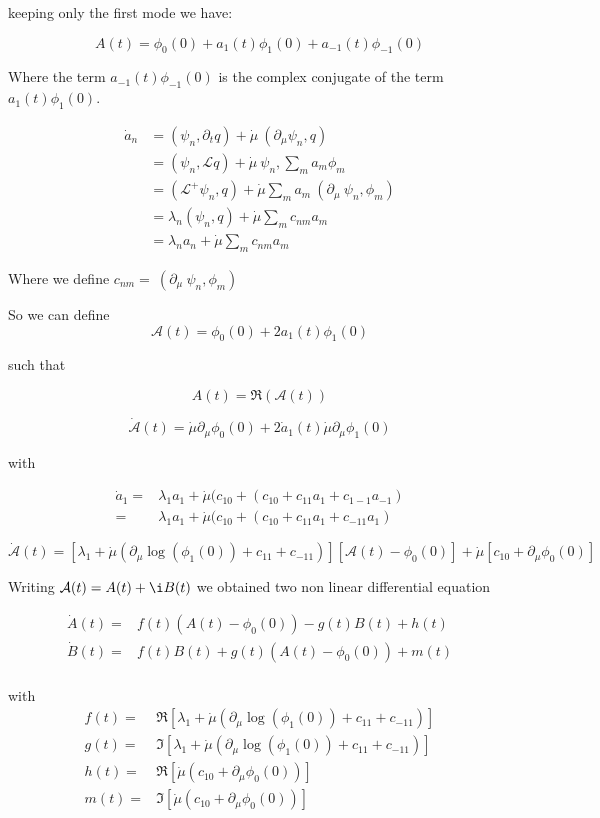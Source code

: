 \documentclass[a4paper,12pt,twoside]{article}
\def \be {\begin{equation}}
\def \ee {\end{equation}}
\begin{document}
keeping only the first mode we have:

\be
A(t)=\phi_0(0) + a_1(t)\phi_1(0) +a_{-1}(t)\phi_{-1}(0)
\ee

Where the term $a_{-1}(t)\phi_{-1}(0)$ is the complex conjugate  of the term $a_1(t)\phi_1(0)$. 


\begin{align}
\dot{a}_n&=(\psi_n,\partial_tq) + \dot{\mu}\: (\partial_{\mu}\psi_n,q)   \nonumber \\
&=(\psi_n,\mathcal{L}q)  +   \dot{\mu}\:\psi_n,\sum_ma_m\phi_m\nonumber \\
&=(\mathcal{L}^+\psi_n,q)+ \dot{\mu}\sum_ma_m\:(\partial_{\mu}\:\psi_n,\phi_m) \nonumber \\
&=\lambda_n(\psi_n,q) +  \dot{\mu}\sum_mc_{nm}a_m \nonumber \\
&=\lambda_na_n   +  \dot{\mu}\sum_mc_{nm}a_m
\end{align}

Where we define $c_{nm} = \:(\partial_{\mu}\:\psi_n,\phi_m)$

So we can define 
\be
\mathcal{A}(t)=\phi_0(0) + 2a_1(t)\phi_1(0) 
\ee

such that

\be
A(t)=\Re(\mathcal{A}(t)) 
\ee

\be
\dot{\mathcal{A}}(t)=\dot{\mu}\partial_{\mu}\phi_0(0) + 2\dot{a}_1(t)\dot{\mu}\partial_{\mu}\phi_1(0) 
\ee

with

\begin{align}
\dot{a}_1=&\lambda_1 a_1 + \dot{\mu}(c_{10}+(c_{10}+c_{11}a_1+c_{1-1}a_{-1}) \nonumber \\
=&\lambda_1 a_1 + \dot{\mu}(c_{10}+(c_{10}+c_{11}a_1+c_{-11}a_{1}) 
\end{align}

\be
\dot{\mathcal{A}}(t)=[\lambda_1+ \dot{\mu}(\partial_{\mu}\log(\phi_1(0))+c_{11}+c_{-11})][\mathcal{A}(t) -\phi_0(0) ]+ \dot{\mu}[c_{10} + \partial_{\mu}\phi_0(0)]
\ee

Writing $\mathcal{A}(t)=A(t)+\i B(t)$ we obtained two non linear differential equation

\begin{align}
\dot{A}(t)=&f(t)(A(t)-\phi_0(0))-g(t)B(t) +h(t)\\
\dot{B}(t)=&f(t)B(t) + g(t)(A(t)-\phi_0(0)) +m(t)\\
\end{align}

with
\begin{align}
f(t)=&\Re[\lambda_1+ \dot{\mu}(\partial_{\mu}\log(\phi_1(0))+c_{11}+c_{-11})]\\
g(t)=&\Im[\lambda_1+ \dot{\mu}(\partial_{\mu}\log(\phi_1(0))+c_{11}+c_{-11})]\\
h(t)=&\Re[\dot{\mu}(c_{10} + \partial_{\mu}\phi_0(0))]\\
m(t)=&\Im[\dot{\mu}(c_{10} + \partial_{\mu}\phi_0(0))]
\end{align}
\end{document}
